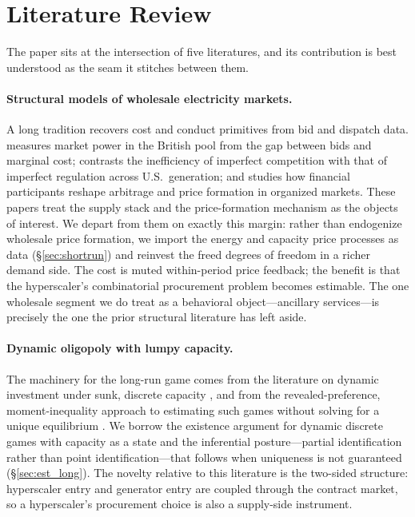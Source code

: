 \documentclass[12pt,letterpaper]{article}
\begin{document}
\section{Literature Review}
\label{sec:lit}

The paper sits at the intersection of five literatures, and its contribution
is best understood as the seam it stitches between them.

\paragraph{Structural models of wholesale electricity markets.} A long
tradition recovers cost and conduct primitives from bid and dispatch data.
\citet{wolfram1999measuring} measures market power in the British pool from the
gap between bids and marginal cost; \citet{cicala2022imperfect} contrasts the
inefficiency of imperfect competition with that of imperfect regulation across
U.S.\ generation; and \citet{mercadal2016electricity} studies how financial
participants reshape arbitrage and price formation in organized markets. These
papers treat the supply stack and the price-formation mechanism as the
objects of interest. We depart from them on exactly this margin: rather than
endogenize wholesale price formation, we import the energy and capacity price
processes as data (\S\ref{sec:shortrun}) and reinvest the freed degrees of
freedom in a richer demand side. The cost is muted within-period price
feedback; the benefit is that the hyperscaler's combinatorial procurement
problem becomes estimable. The one wholesale segment we do treat as a
behavioral object---ancillary services---is precisely the one the prior
structural literature has left aside.

\paragraph{Dynamic oligopoly with lumpy capacity.} The machinery for the
long-run game comes from the literature on dynamic investment under sunk,
discrete capacity \citep{gowrisankaran2012capacity}, and from the
revealed-preference, moment-inequality approach to estimating such games
without solving for a unique equilibrium \citep{holmes2011walmart}. We borrow
the existence argument for dynamic discrete games with capacity as a state and
the inferential posture---partial identification rather than point
identification---that follows when uniqueness is not guaranteed
(\S\ref{sec:est_long}). The novelty relative to this literature is the
two-sided structure: hyperscaler entry and generator entry are coupled through
the contract market, so a hyperscaler's procurement choice is also a
supply-side instrument.
\end{document}
